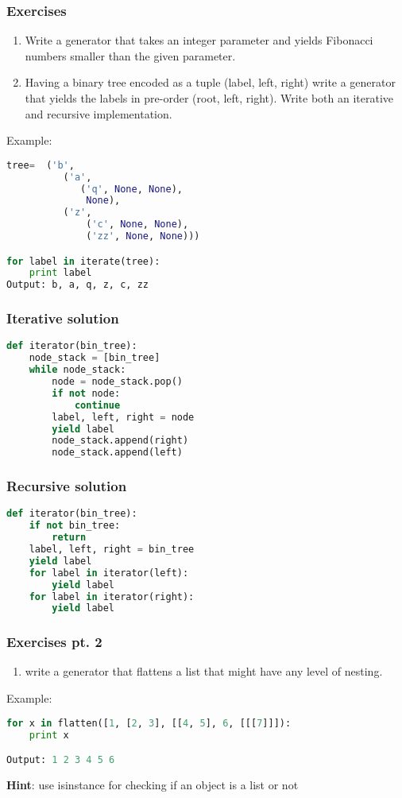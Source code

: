 \documentclass{beamer}
\begin{document}
\begin{frame}[fragile]
\frametitle{Exercises}
\begin{enumerate}
  \item Write a generator that takes an integer parameter and yields Fibonacci numbers
    smaller than the given parameter.
  \item Having a binary tree encoded as a tuple (label, left, right) write a generator that
    yields the labels in pre-order (root, left, right). Write both an iterative and recursive
    implementation.
\end{enumerate}
Example:
\begin{lstlisting}[language=python]
tree=  ('b',
          ('a',
             ('q', None, None),
              None),
          ('z',
              ('c', None, None),
              ('zz', None, None)))

for label in iterate(tree):
    print label
Output: b, a, q, z, c, zz
\end{lstlisting}
\end{frame}


\begin{frame}[fragile]
\frametitle{Iterative solution}
\begin{lstlisting}[language=python]
def iterator(bin_tree):
    node_stack = [bin_tree]
    while node_stack:
        node = node_stack.pop()
        if not node:
            continue
        label, left, right = node
        yield label
        node_stack.append(right)
        node_stack.append(left)
\end{lstlisting}
\end{frame}

\begin{frame}[fragile]
\frametitle{Recursive solution}
\begin{lstlisting}[language=python]
def iterator(bin_tree):
    if not bin_tree:
        return
    label, left, right = bin_tree
    yield label
    for label in iterator(left):
        yield label
    for label in iterator(right):
        yield label
\end{lstlisting}
\end{frame}

\begin{frame}[fragile]
\frametitle{Exercises pt. 2}
\begin{enumerate}
  \item write a generator that flattens a list that might have any level of nesting.
\end{enumerate}
Example:
\begin{lstlisting}[language=python]
for x in flatten([1, [2, 3], [[4, 5], 6, [[[7]]]):
    print x

Output: 1 2 3 4 5 6
\end{lstlisting}
\vspace{5 mm}
{\bf Hint}: use isinstance for checking if an object is a list or not
\end{frame}
\end{document}
